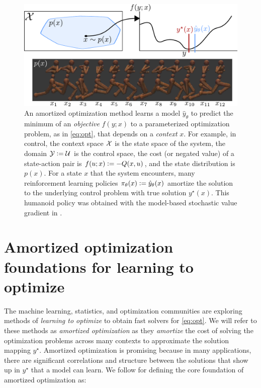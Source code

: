 \documentclass[twoside,11pt]{article}
\begin{document}
\begin{figure}[t]
  \centering
  \includegraphics[width=\textwidth]{fig/overview.pdf}
  \caption{An amortized optimization method learns
    a model $\hat y_\theta$ to predict the minimum
    of an \emph{objective} $f(y;x)$ to a parameterized
    optimization problem, as in \cref{eq:opt}, that depends on
    a \emph{context} $x$.
    For example, in control,
    the context space ${\mathcal{X}}$ is the state space of the system,
    the domain ${\mathcal{Y}}\vcentcolon={\mathcal{U}}$ is the control space,
    the cost (or negated value) of a state-action
    pair is $f(u; x)\vcentcolon= -Q(x,u)$, and the state distribution is $p(x)$.
    For a state $x$ that the system encounters,
    many reinforcement learning policies $\pi_\theta(x)\vcentcolon=\hat y_\theta(x)$
    amortize the solution to the underlying control problem
    with true solution $y^\star(x)$.
    This humanoid policy was obtained with the model-based
    stochastic value gradient in \citet{amos2021model}.
  }
  \label{fig:overview}
\end{figure}

\section{Amortized optimization foundations for learning to optimize}
The machine learning, statistics, and optimization
communities are exploring methods of \emph{learning
to optimize} to obtain fast solvers for \cref{eq:opt}.
We will refer to these methods as \emph{amortized optimization}
as they \emph{amortize} the cost of solving the
optimization problems across many contexts to approximate
the solution mapping $y^\star$.
Amortized optimization is promising because in many applications,
there are significant correlations and structure between the
solutions that show up in $y^\star$ that a model can learn.
We follow \citet{shu2017amortized} for defining the core
foundation of amortized optimization as:
\end{document}
